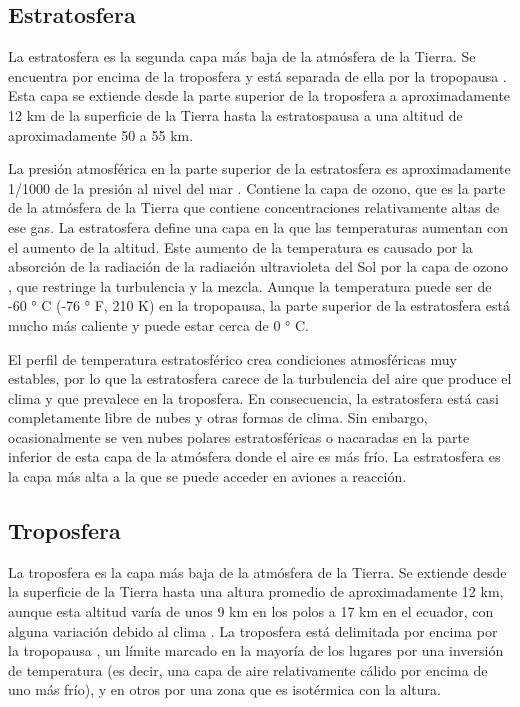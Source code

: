 \documentclass[12pt]{article}
\begin{document}
\subsection{Estratosfera}

La estratosfera es la segunda capa más baja de la atmósfera de la Tierra. Se encuentra por encima de la troposfera y está separada de ella por la tropopausa . Esta capa se extiende desde la parte superior de la troposfera a aproximadamente 12 km de la superficie de la Tierra hasta la estratospausa a una altitud de aproximadamente 50 a 55 km.

La presión atmosférica en la parte superior de la estratosfera es aproximadamente 1/1000 de la presión al nivel del mar . Contiene la capa de ozono, que es la parte de la atmósfera de la Tierra que contiene concentraciones relativamente altas de ese gas. La estratosfera define una capa en la que las temperaturas aumentan con el aumento de la altitud. Este aumento de la temperatura es causado por la absorción de la radiación de la radiación ultravioleta del Sol por la capa de ozono , que restringe la turbulencia y la mezcla. Aunque la temperatura puede ser de -60 ° C (-76 ° F, 210 K) en la tropopausa, la parte superior de la estratosfera está mucho más caliente y puede estar cerca de 0 ° C.

El perfil de temperatura estratosférico crea condiciones atmosféricas muy estables, por lo que la estratosfera carece de la turbulencia del aire que produce el clima y que prevalece en la troposfera. En consecuencia, la estratosfera está casi completamente libre de nubes y otras formas de clima. Sin embargo, ocasionalmente se ven nubes polares estratosféricas o nacaradas en la parte inferior de esta capa de la atmósfera donde el aire es más frío. La estratosfera es la capa más alta a la que se puede acceder en aviones a reacción.

\subsection{Troposfera}

La troposfera es la capa más baja de la atmósfera de la Tierra. Se extiende desde la superficie de la Tierra hasta una altura promedio de aproximadamente 12 km, aunque esta altitud varía de unos 9 km en los polos a 17 km en el ecuador, con alguna variación debido al clima . La troposfera está delimitada por encima por la tropopausa , un límite marcado en la mayoría de los lugares por una inversión de temperatura (es decir, una capa de aire relativamente cálido por encima de uno más frío), y en otros por una zona que es isotérmica con la altura.
\end{document}
